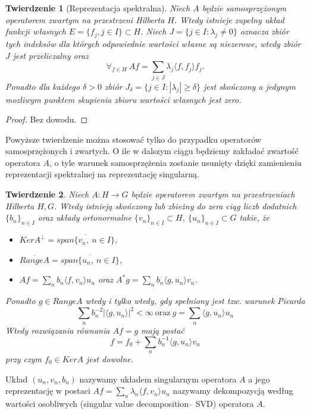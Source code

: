 \documentclass[12pt]{article}
\newtheorem{tw}{Twierdzenie}
\begin{document}
\begin{tw}[Reprezentacja spektralna]
Niech $A$ będzie samosprzężonym operatorem zwartym na przestrzeni Hilberta $H$. Wtedy istnieje zupełny układ funkcji własnych $E=\{f_j,j\in I\}\subset H$. Niech $J=\{j\in I\colon\lambda_j\neq 0\}$ oznacza zbiór tych indeksów dla których odpowiednie wartości własne są niezerowe, wtedy zbiór $J$ jest przeliczalny oraz 
\begin{displaymath}
\forall_{f\in H}\ Af=\sum_{j\in J}\lambda_j\langle f,f_j\rangle f_j.
\end{displaymath}
Ponadto dla każdego $\delta>0$ zbiór $J_{\delta}=\{j\in I\colon |\lambda_j|\geq \delta\}$ jest skończony a jedynym mozliwym punktem skupienia zbioru wartości własnych jest zero.
\end{tw}
\begin{proof}
Bez dowodu.
\end{proof}
Powyższe twierdzenie można stosować tylko do przypadku operatorów samosprzężonych i zwartych. O ile w dalszym ciągu będziemy zakładać zwartość operatora $A$, o tyle warunek samosprzężenia zostanie usunięty dzięki zamienieniu reprezentacji spektralnej na reprezentację singularną.
\begin{tw}
Niech $A\colon H\to G$ będzie operatorem zwartym na przestrzeniach Hilberta $H,G$. Wtedy istnieją skończony lub zbieżny do zera ciąg liczb dodatnich $\{b_n\}_{n\in I}$ oraz układy ortonormalne $\{v_n\}_{n\in I}\subset H,\ \{u_n\}_{n\in I}\subset G$ takie, że
\begin{itemize}
\item $KerA^{\perp}=\overline{span\{v_n,\ n\in I\}}$,
\item $\overline{RangeA}=\overline{span\{u_n,\ n\in I\}}$,
\item $Af=\sum_nb_n\langle f, v_n\rangle u_n$ oraz $A^*g=\sum_nb_n\langle g, u_n\rangle v_n$.
\end{itemize}
Ponadto $g\in RangeA$ wtedy i tylko wtedy, gdy spełniony jest tzw. warunek Picarda
\begin{displaymath} 
\sum_nb_n^{-2}|\langle g, u_n\rangle|^2< \infty\ \textrm{oraz}\ g=\sum_n\langle g, u_n\rangle u_n
\end{displaymath}
Wtedy rozwiązania równania $Af=g$ mają postać 
\begin{displaymath}
f=f_0+\sum_nb_n^{-1}\langle g, u_n\rangle v_n
\end{displaymath}
przy czym $f_0\in KerA$ jest dowolne.
\end{tw}
Układ $(u_n,v_n,b_n)$ nazywamy układem singularnym operatora $A$ a jego reprezentację w postaci $Af=\sum_n\lambda_n\langle f,v_n\rangle u_n$ nazywamy dekompozycją według wartości osobliwych (singular value decomposition-- SVD) operatora $A$.
\end{document}
